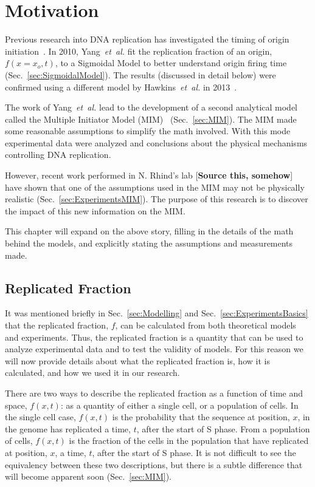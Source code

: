 \chapter{Motivation}
\label{ch:Motivation}

Previous research into DNA replication has investigated the timing of origin initiation~\cite{ScottsPaper,Bechhoefer2012374,deMouraModel1,deMouraModel2,StochasticTermination}.
In 2010, Yang~\emph{et~al.} fit the replication fraction of an origin, $f(x=x_o,t)$, to a Sigmoidal Model to better understand origin firing time~\cite{ScottsPaper} (Sec.~\ref{sec:SigmoidalModel}).
The results (discussed in detail below) were confirmed using a different model by Hawkins~\emph{et~al.} in 2013~\cite{StochasticTermination}.

The work of Yang~\emph{et~al.} lead to the development of a second analytical model called the Multiple Initiator Model (MIM)~\cite{ScottsPaper} (Sec.~\ref{sec:MIM}).
The MIM made some reasonable assumptions to simplify the math involved.
With this mode experimental data were analyzed and conclusions about the physical mechanisms controlling DNA replication.

However, recent work performed in N. Rhind's lab [\textbf{Source this, somehow}] have shown that one of the assumptions used in the MIM may not be physically realistic (Sec.~\ref{sec:ExperimentsMIM}).
The purpose of this research is to discover the impact of this new information on the MIM.

This chapter will expand on the above story, filling in the details of the math behind the models, and explicitly stating the assumptions and measurements made.


	\section{Replicated Fraction}
	\label{sec:ReplicatedFraction}
	
	It was mentioned briefly in Sec.~\ref{sec:Modelling} and Sec.~\ref{sec:ExperimentsBasics} that the replicated fraction, $f$, can be calculated from both theoretical models and experiments.
	Thus, the replicated fraction is a quantity that can be used to analyze experimental data and to test the validity of models.
	For this reason we will now provide details about what the replicated fraction is, how it is calculated, and how we used it in our research.
	
	There are two ways to describe the replicated fraction as a function of time and space, $f(x,t)$:
	as a quantity of either a single cell, or a population of cells.
	In the single cell case, $f(x,t)$ is the probability that the sequence at position, $x$, in the genome has replicated a time, $t$, after the start of S phase.
	From a population of cells, $f(x,t)$ is the fraction of the cells in the population that have replicated at position, $x$, a time, $t$, after the start of S phase.
	It is not difficult to see the equivalency between these two descriptions, but there is a subtle difference that will become apparent soon (Sec.~\ref{sec:MIM}).
	
